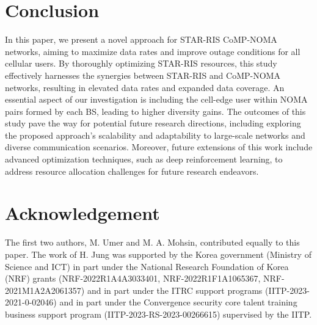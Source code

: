 \documentclass[conference]{IEEEtran}
\begin{document}
\section{Conclusion}
In this paper, we present a novel approach for STAR-RIS CoMP-NOMA networks, aiming to maximize data rates and improve outage conditions for all cellular users. By thoroughly optimizing STAR-RIS resources, this study effectively harnesses the synergies between STAR-RIS and CoMP-NOMA networks, resulting in elevated data rates and expanded data coverage. An essential aspect of our investigation is including the cell-edge user within NOMA pairs formed by each BS, leading to higher diversity gains. The outcomes of this study pave the way for potential future research directions, including exploring the proposed approach's scalability and adaptability to large-scale networks and diverse communication scenarios. Moreover, future extensions of this work include advanced optimization techniques, such as deep reinforcement learning, to address resource allocation challenges for future research endeavors.

\section*{Acknowledgement}
The first two authors, M. Umer and M. A. Mohsin, contributed equally to this
paper. The work of H. Jung was supported by the Korea government (Ministry of Science and ICT) in part under the National Research Foundation of Korea (NRF) grants (NRF-2022R1A4A3033401, NRF-2022R1F1A1065367, NRF-2021M1A2A2061357) and in part under the ITRC support programs (IITP-2023-2021-0-02046) and in part under the Convergence security core talent training business support program (IITP-2023-RS-2023-00266615) supervised by the IITP.



\end{document}
